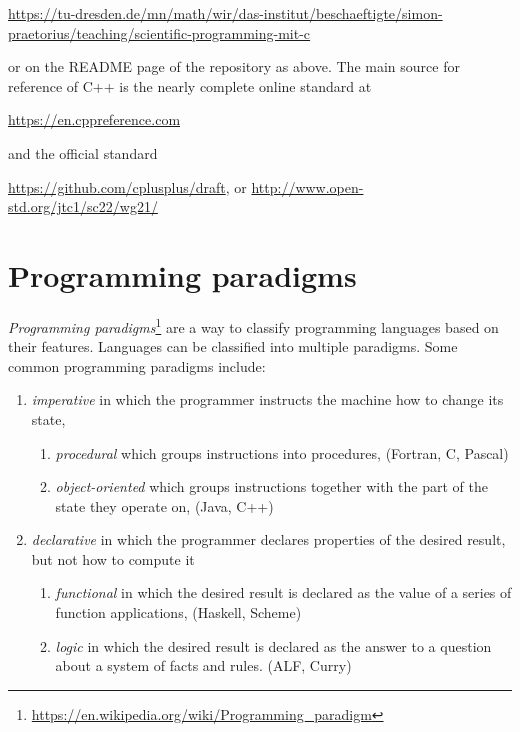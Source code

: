 \url{https://tu-dresden.de/mn/math/wir/das-institut/beschaeftigte/simon-praetorius/teaching/scientific-programming-mit-c}

or on the README page of the repository as above. The main source for reference of C++ is the nearly complete online standard at

\url{https://en.cppreference.com}

and the official standard

\url{https://github.com/cplusplus/draft}, or \url{http://www.open-std.org/jtc1/sc22/wg21/}


\section{Programming paradigms}
\emph{Programming paradigms}\footnote{\url{https://en.wikipedia.org/wiki/Programming_paradigm}} are a way to classify programming languages
based on their features. Languages can be classified into multiple paradigms. Some common programming paradigms include:
\begin{enumerate}
  \item \emph{imperative} in which the programmer instructs the machine how to change its state,
    \begin{enumerate}
      \item \emph{procedural} which groups instructions into procedures, (Fortran, C, Pascal)
      \item \emph{object-oriented} which groups instructions together with the part of the state they operate on, (Java, C++)
    \end{enumerate}
  \item \emph{declarative} in which the programmer declares properties of the desired result, but not how to compute it
    \begin{enumerate}
      \item \emph{functional} in which the desired result is declared as the value of a series of function applications, (Haskell, Scheme)
      \item \emph{logic} in which the desired result is declared as the answer to a question about a system of facts and rules. (ALF, Curry)
    \end{enumerate}
\end{enumerate}

